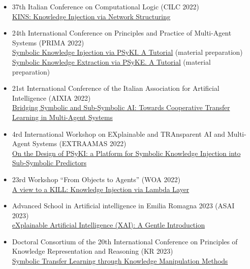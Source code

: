 \documentclass[11pt]{article}
\begin{document}
\begin{itemize}
	\item 37th Italian Conference on Computational Logic (CILC 2022)
	\\\href{https://apice.unibo.it/xwiki/bin/view/Talk/KinsCilc2022}{KINS: Knowledge Injection via Network Structuring}
	\item 24th International Conference on Principles and Practice of Multi-Agent Systems (PRIMA 2022)
	\\\href{https://apice.unibo.it/xwiki/bin/view/Talk/PsykitutorialPrima2022}{Symbolic Knowledge Injection via PSyKI. A Tutorial} (material preparation)
	\\\href{https://apice.unibo.it/xwiki/bin/view/Talk/PsykiPrima2022}{Symbolic Knowledge Extraction via PSyKE. A Tutorial} (material preparation)
	\item 21st International Conference of the Italian Association for Artificial Intelligence (AIXIA 2022)
	\\\href{https://apice.unibo.it/xwiki/bin/view/Talk/CtlAixia2022}{Bridging Symbolic and Sub-Symbolic AI: Towards Cooperative Transfer Learning in Multi-Agent Systems}
	\item 4rd International Workshop on EXplainable and TRAnsparent AI and Multi-Agent Systems (EXTRAAMAS 2022)
	\\\href{https://apice.unibo.it/xwiki/bin/view/Talk/PsykiExtraamas2022}{On the Design of PSyKI: a Platform for Symbolic Knowledge Injection into Sub-Symbolic Predictors}
	\item 23rd Workshop ``From Objects to Agents'' (WOA 2022)
	\\\href{https://apice.unibo.it/xwiki/bin/view/Talk/KillWoa2022}{A view to a KILL: Knowledge Injection via Lambda Layer}
	\item Advanced School in Artificial intelligence in Emilia Romagna 2023 (ASAI 2023)
	\\\href{https://apice.unibo.it/xwiki/bin/view/Talk/XaiAsaiErBertinoro2023}{eXplainable Artificial Intelligence (XAI): A Gentle Introduction}
	\item Doctoral Consortium of the 20th International Conference on Principles of Knowledge Representation and Reasoning (KR 2023)
	\\\href{https://apice.unibo.it/xwiki/bin/view/Talk/SymbolicTransferLearning}{Symbolic Transfer Learning through Knowledge Manipulation Methods}
\end{itemize}
\end{document}
